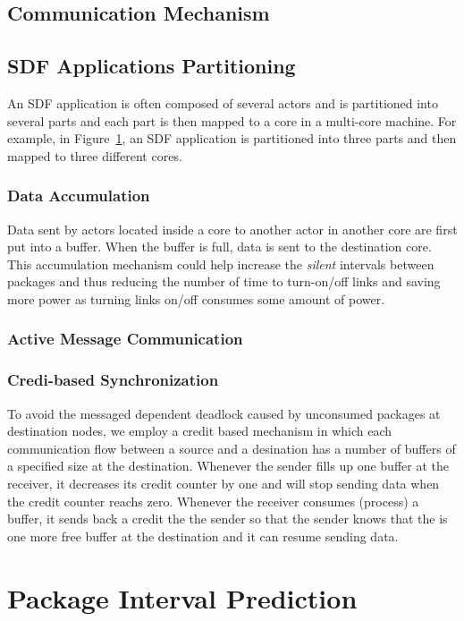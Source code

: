 \documentclass[12pt]{article}
\begin{document}
\subsection{Communication Mechanism}
\subsection{SDF Applications Partitioning}
An SDF application is often composed of several actors and is partitioned into
several parts and each part is then mapped to a core in a multi-core machine.
For example, in Figure~\ref{}, an SDF application is partitioned into three
parts and then mapped to three different cores.

\subsubsection{Data Accumulation}
Data sent by actors located inside a core to another actor in another core are
first put into a buffer. When the buffer is full, data is sent to the
destination core. This accumulation mechanism could help increase the
\textit{silent} intervals between packages and thus reducing the number of time
to turn-on/off links and saving more power as turning links on/off consumes some
amount of power.

\subsubsection{Active Message Communication}

\subsubsection{Credi-based Synchronization}
To avoid the messaged dependent deadlock caused by unconsumed packages at
destination nodes, we employ a credit based mechanism in which each
communication flow between a source and a desination has a number of buffers of
a specified size at the destination. Whenever the sender fills up one buffer at
the receiver, it decreases its credit counter by one and will stop sending data
when the credit counter reachs zero. Whenever the receiver consumes (process) a
buffer, it sends back a credit the the sender so that the sender knows that the
is one more free buffer at the destination and it can resume sending data.

\section{Package Interval Prediction}
\end{document}
